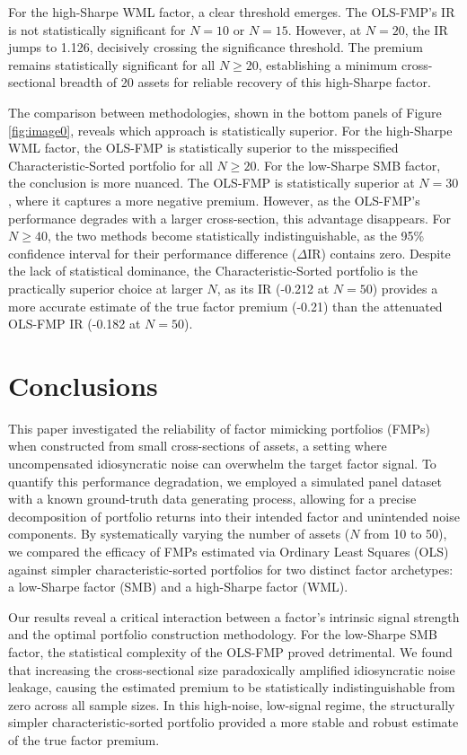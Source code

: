 \documentclass[]{article}
\begin{document}
For the high-Sharpe WML factor, a clear threshold emerges. The OLS-FMP's IR is not statistically significant for $N=10$ or $N=15$. However, at $N=20$, the IR jumps to 1.126, decisively crossing the significance threshold. The premium remains statistically significant for all $N \ge 20$, establishing a minimum cross-sectional breadth of 20 assets for reliable recovery of this high-Sharpe factor.

The comparison between methodologies, shown in the bottom panels of Figure \ref{fig:image0}, reveals which approach is statistically superior. For the high-Sharpe WML factor, the OLS-FMP is statistically superior to the misspecified Characteristic-Sorted portfolio for all $N \ge 20$. For the low-Sharpe SMB factor, the conclusion is more nuanced. The OLS-FMP is statistically superior at $N=30$, where it captures a more negative premium. However, as the OLS-FMP's performance degrades with a larger cross-section, this advantage disappears. For $N \ge 40$, the two methods become statistically indistinguishable, as the 95\% confidence interval for their performance difference ($\Delta\text{IR}$) contains zero. Despite the lack of statistical dominance, the Characteristic-Sorted portfolio is the practically superior choice at larger $N$, as its IR (-0.212 at $N=50$) provides a more accurate estimate of the true factor premium (-0.21) than the attenuated OLS-FMP IR (-0.182 at $N=50$).

\section{Conclusions}
\label{sec:conclusions}
This paper investigated the reliability of factor mimicking portfolios (FMPs) when constructed from small cross-sections of assets, a setting where uncompensated idiosyncratic noise can overwhelm the target factor signal. To quantify this performance degradation, we employed a simulated panel dataset with a known ground-truth data generating process, allowing for a precise decomposition of portfolio returns into their intended factor and unintended noise components. By systematically varying the number of assets ($N$ from 10 to 50), we compared the efficacy of FMPs estimated via Ordinary Least Squares (OLS) against simpler characteristic-sorted portfolios for two distinct factor archetypes: a low-Sharpe factor (SMB) and a high-Sharpe factor (WML).

Our results reveal a critical interaction between a factor's intrinsic signal strength and the optimal portfolio construction methodology. For the low-Sharpe SMB factor, the statistical complexity of the OLS-FMP proved detrimental. We found that increasing the cross-sectional size paradoxically amplified idiosyncratic noise leakage, causing the estimated premium to be statistically indistinguishable from zero across all sample sizes. In this high-noise, low-signal regime, the structurally simpler characteristic-sorted portfolio provided a more stable and robust estimate of the true factor premium.
\end{document}

